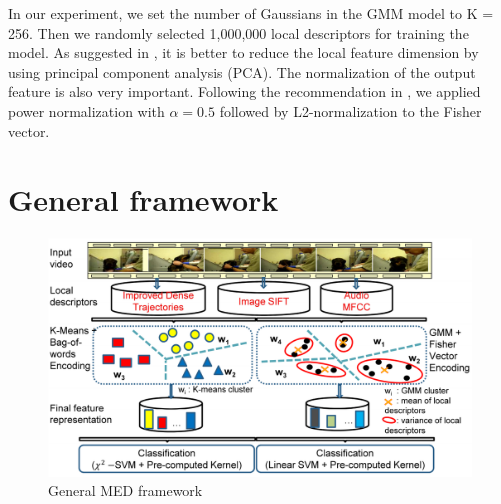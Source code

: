 In our experiment, we set the number of Gaussians in the GMM model to K = 256. Then we randomly selected 1,000,000 local descriptors for training the model. As suggested in \cite{perronnin2010improving}, it is better to reduce the local feature dimension by using principal component analysis (PCA). The normalization of the output feature is also very important. Following the recommendation in \cite{perronnin2010improving}, we applied power normalization with $\alpha=0.5$ followed by L2-normalization to the Fisher vector.

\section{General framework}
\begin{figure}
	\centering
	\includegraphics[width=1\textwidth]{framework.pdf}
	\caption{General MED framework}
	\label{med_framework}
\end{figure}



